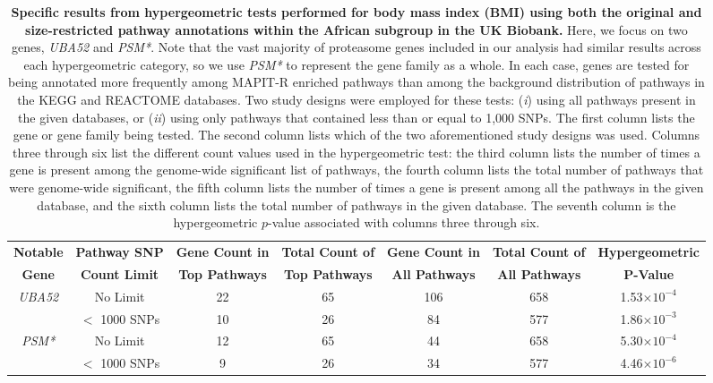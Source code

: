\documentclass[10pt]{article}
\begin{document}
\begin{table}[H]
\centering
\hspace*{-2.5cm}
\begin{tabular}{|c|c|c|c|c|c|c|}
  \hline
  \textbf{Notable} & \textbf{Pathway SNP} & \textbf{Gene Count in} & \textbf{Total Count of} & \textbf{Gene Count in} & \textbf{Total Count of} & \textbf{Hypergeometric} \\
 \textbf{Gene} & \textbf{Count Limit} & \textbf{Top Pathways} & \textbf{Top Pathways} & \textbf{All Pathways} & \textbf{All Pathways} & \textbf{$\bm{P}$-Value} \\[2pt]
  \hline
 \multirow{2}{*}{\textit{UBA52}} & No Limit & 22 & 65 & 106 & 658 & 1.53$\times10^{-4}$ \\ [2pt] \cline{2-7}
 & $<$ 1000 SNPs & 10 & 26 & 84 & 577 & 1.86$\times10^{-3}$ \\ [2pt]\hline
\multirow{2}{*}{\textit{PSM*}} & No Limit & 12 & 65 & 44 & 658 & 5.30$\times10^{-4}$ \\ [2pt] \cline{2-7}
 & $<$ 1000 SNPs & 9 & 26 & 34 & 577 & 4.46$\times10^{-6}$ \\ [2pt]
   \hline
\end{tabular}
\caption[TBD]{\textbf{Specific results from hypergeometric tests performed for body mass index (BMI) using both the original and size-restricted pathway annotations within the African subgroup in the UK Biobank.} Here, we focus on two genes, \textit{UBA52} and \textit{PSM*}. Note that the vast majority of proteasome genes included in our analysis had similar results across each hypergeometric category, so we use \textit{PSM*} to represent the gene family as a whole. In each case, genes are tested for being annotated more frequently among MAPIT-R enriched pathways than among the background distribution of pathways in the KEGG and REACTOME databases. Two study designs were employed for these tests: (\textit{i}) using all pathways present in the given databases, or (\textit{ii}) using only pathways that contained less than or equal to 1,000 SNPs. The first column lists the gene or gene family being tested. The second column lists which of the two aforementioned study designs was used. Columns three through six list the different count values used in the hypergeometric test: the third column lists the number of times a gene is present among the genome-wide significant list of pathways, the fourth column lists the total number of pathways that were genome-wide significant, the fifth column lists the number of times a gene is present among all the pathways in the given database, and the sixth column lists the total number of pathways in the given database. The seventh column is the hypergeometric $p$-value associated with columns three through six.}
\label{InterPath-Supp-Table-AllPops-TopGeneCount-HypergeometricTests}
\end{table}
\end{document}
